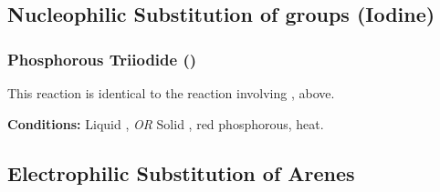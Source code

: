 

		\pagebreak
		\subsection{Nucleophilic Substitution of  groups (Iodine)}

			\subsubsection{Phosphorous Triiodide ()}

				This reaction is identical to the reaction involving , above.

				\vspace{1.5em}
				\vbox{\textbf{Conditions:}	\tabto{35mm}Liquid , \textit{OR}
											\tabto{35mm}Solid , {\color{Red}red} phosphorous, heat.}





		\subsection{Electrophilic Substitution of Arenes}

